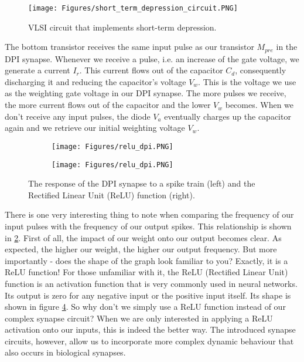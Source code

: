 \begin{figure}
    \centering
    \texttt{[image: Figures/short\_term\_depression\_circuit.PNG]}
    \caption{VLSI circuit that implements short-term depression.}
    \label{fig:short_term_depression_circuit}
\end{figure}

The bottom transistor receives the same input pulse as our transistor $M_{pre}$ in the DPI synapse. Whenever we receive a pulse, i.e. an increase of the gate voltage, we generate a current $I_r$. This current flows out of the capacitor $C_d$, consequently discharging it and reducing the capacitor's voltage $V_w$. This is the voltage we use as the weighting gate voltage in our DPI synapse. The more pulses we receive, the more current flows out of the capacitor and the lower $V_w$ becomes. When we don't receive any input pulses, the diode $V_a$ eventually charges up the capacitor again and we retrieve our initial weighting voltage $V_w$.\\

\begin{figure}
\centering
\begin{subfigure}{0.5\textwidth}
  \centering
  \texttt{[image: Figures/relu\_dpi.PNG]}
  \label{fig:relu_dpi}
\end{subfigure}%
\begin{subfigure}{0.5\textwidth}
  \centering
  \texttt{[image: Figures/relu\_dpi.PNG]}
  \label{fig:relu}
\end{subfigure}
\caption{The response of the DPI synapse to a spike train (left) and the Rectified Linear Unit (ReLU) function (right).}
\end{figure}

There is one very interesting thing to note when comparing the frequency of our input pulses with the frequency of our output spikes. This relationship is shown in \ref{fig:relu_dpi}. First of all, the impact of our weight onto our output becomes clear. As expected, the higher our weight, the higher our output frequency. But more importantly - does the shape of the graph look familiar to you? Exactly, it is a ReLU function! For those unfamiliar with it, the ReLU (Rectified Linear Unit) function is an activation function that is very commonly used in neural networks. Its output is zero for any negative input or the positive input itself. Its shape is shown in figure \ref{fig:relu}. So why don't we simply use a ReLU function instead of our complex synapse circuit? When we are only interested in applying a ReLU activation onto our inputs, this is indeed the better way. The introduced synapse circuits, however, allow us to incorporate more complex dynamic behaviour that also occurs in biological synapses.